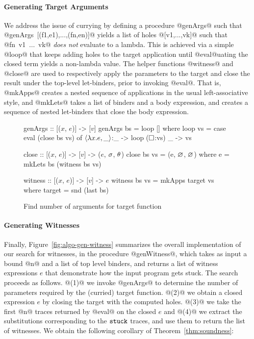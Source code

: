 \paragraph{Generating Target Arguments}
%
We address the issue of currying by defining a procedure @genArgs@ such that \\
\hbox{@genArgs [(f1,e1),...,(fn,en)]@} yields a list of holes @[v1,...,vk]@
such that \hbox{@fn v1 ... vk@} \emph{does not} evaluate to a lambda.
%
This is achieved via a simple @loop@ that keeps adding holes to the
target application until @eval@uating the closed term yields a
non-lambda value.
%
The helper functions @witness@ and @close@ are used to respectively
apply the parameters to the target and close the result under the top-level
let-binders, prior to invoking \hbox{@eval@.}
%
That is, @mkApps@ creates a nested sequence of applications in
the usual left-associative style, and @mkLets@ takes a list of
binders and a body expression, and creates a sequence of nested
let-binders that close the body expression.

\begin{figure}[t]
\centering
\begin{mcode}
genArgs :: [($x$, $e$)] -> [$v$]
genArgs bs = loop []
  where
  loop vs  = case eval (close bs vs) of
               $\langle \lambda x. e, \_ \rangle$:_ -> loop ($\square{}$:vs)
               _        -> vs

close :: [($x$, $e$)] -> [$v$] -> ($e$, $\sigma$, $\theta$)
close bs vs = (e, $\varnothing$, $\varnothing$)
  where
    e       = mkLets bs (witness bs vs)

witness :: [($x$, $e$)] -> [$v$] -> $e$
witness bs vs = mkApps target vs
  where
    target    = snd (last bs)
\end{mcode}
\caption{Find number of arguments for target function}
\label{fig:algo-gen-args}
\end{figure}


\paragraph{Generating Witnesses}
%
Finally, Figure~\ref{fig:algo-gen-witness} summarizes the overall
implementation of our search for witnesses, in the procedure @genWitness@,
which takes as input a bound @n@ and a list of top level binders, and
returns a list of witness expressions $e$ that demonstrate how the input
program gets stuck.
%
The search proceeds as follows.
%
@(1)@ we invoke @genArgs@ to determine the number of parameters required
by the (curried) target function.
%
@(2)@ we obtain a closed expression $e$ by closing the target with the
computed holes.
%
@(3)@ we take the first @n@ traces returned by @eval@ on the closed $e$
and
@(4)@ we extract the substitutions corresponding to the $\mathtt{stuck}$ traces,
and use them to return the list of witnesses.
%
We obtain the following corollary of Theorem~\ref{thm:soundness}:

